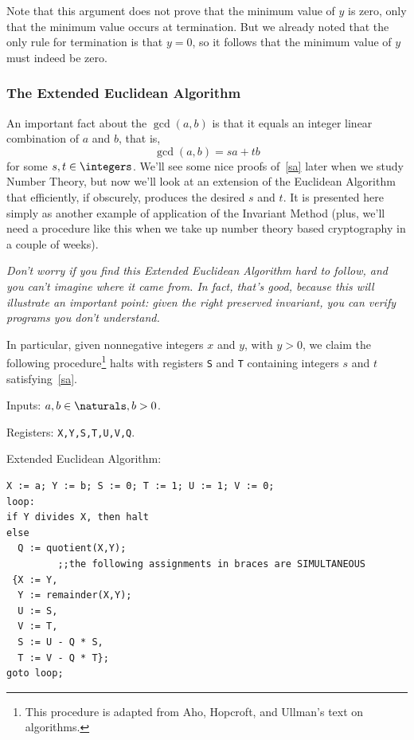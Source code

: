 Note that this argument does not prove that the minimum value of $y$ is
zero, only that the minimum value occurs at termination.  But we already
noted that the only rule for termination is that $y=0$, so it follows that
the minimum value of $y$ must indeed be zero.

\subsubsection{The Extended Euclidean Algorithm}\label{ExtendedGCD}

An important fact about the $\gcd(a,b)$ is that it equals an integer
linear combination of $a$ and $b$, that is,
\begin{equation}\label{sa}
\gcd(a,b) = sa+ tb
\end{equation}
for some $s,t \in \integers$.  We'll see some nice proofs
of~\eqref{sa} later when we study Number Theory, but now we'll look
at an extension of the Euclidean Algorithm that efficiently, if
obscurely, produces the desired $s$ and $t$.  It is presented here
simply as another example of application of the Invariant Method
(plus, we'll need a procedure like this when we take up number theory
based cryptography in a couple of weeks).

\emph{Don't worry if you find this Extended Euclidean Algorithm hard to
  follow, and you can't imagine where it came from.  In fact, that's good,
  because this will illustrate an important point: given the right
  preserved invariant, you can verify programs you don't understand.}

In particular, given nonnegative integers $x$ and $y$, with $y>0$, we
claim the following procedure\footnote{This procedure is adapted from Aho,
  Hopcroft, and Ullman's text on algorithms.}  halts with registers
\texttt{S} and \texttt{T} containing integers $s$ and $t$
satisfying~\eqref{sa}.

Inputs: $a,b \in \naturals, b>0$.

Registers: \texttt{X,Y,S,T,U,V,Q}.

Extended Euclidean Algorithm:
\begin{center}
\begin{verbatim}
X := a; Y := b; S := 0; T := 1; U := 1; V := 0; 
loop:
if Y divides X, then halt
else
  Q := quotient(X,Y);
         ;;the following assignments in braces are SIMULTANEOUS
 {X := Y,
  Y := remainder(X,Y);
  U := S,
  V := T,
  S := U - Q * S,
  T := V - Q * T};
goto loop;
\end{verbatim}
\end{center}

